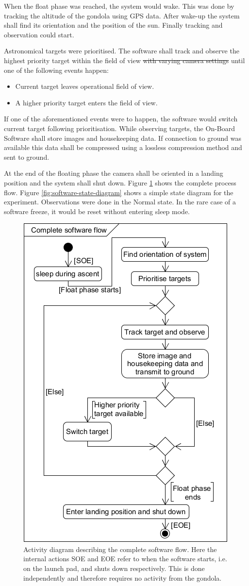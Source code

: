 When the float phase was reached, the system would wake. This was done by tracking the altitude of the gondola using GPS data. After wake-up the system shall find its orientation and the position of the sun. Finally tracking and observation could start.

Astronomical targets were prioritised. The software shall track and observe the highest priority target within the field of view \st{with varying camera settings} until one of the following events happen:

\begin{itemize}
    \item Current target leaves operational field of view.
    \item A higher priority target enters the field of view.
\end{itemize}

If one of the aforementioned events were to happen, the software would switch current target following prioritisation. While observing targets, the On-Board Software shall store images and housekeeping data. If connection to ground was available this data shall be compressed using a lossless compression method and sent to ground.

At the end of the floating phase the camera shall be oriented in a landing position and the system shall shut down. Figure \ref{fig:software-activity-diagram} shows the complete process flow. Figure \ref{fig:software-state-diagram} shows a simple state diagram for the experiment. Observations were done in the Normal state. In the rare case of a software freeze, it would be reset without entering sleep mode.

\begin{figure}[H]
    \centering
    \includegraphics[width=.5\textwidth]{4-experiment-design/img/software/activity-diagram.png}
    \caption{Activity diagram describing the complete software flow. Here the internal actions SOE and EOE refer to when the software starts, i.e. on the launch pad, and shuts down respectively. This is done independently and therefore requires no activity from the gondola.}
    \label{fig:software-activity-diagram}
\end{figure}

